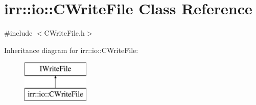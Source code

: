 \hypertarget{classirr_1_1io_1_1_c_write_file}{\section{irr\-:\-:io\-:\-:C\-Write\-File Class Reference}
\label{classirr_1_1io_1_1_c_write_file}
}


{\ttfamily \#include $<$C\-Write\-File.\-h$>$}

Inheritance diagram for irr\-:\-:io\-:\-:C\-Write\-File\-:\begin{figure}[H]
\begin{center}
\leavevmode
\includegraphics[height=2.000000cm]{classirr_1_1io_1_1_c_write_file}
\end{center}
\end{figure}
